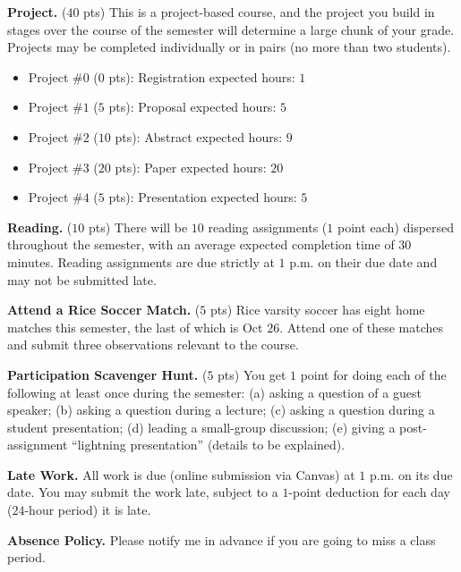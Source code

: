 \documentclass[11pt]{article}
\begin{document}
\begin{adjustwidth}{1cm}{0cm}
  \textbf{Project.} ($40$ pts) This is a project-based course, and the project you build in stages over the course of the semester will determine a large chunk of your grade. Projects may be completed individually or in pairs (no more than two students).
  \begin{itemize}
    \item Project \#$0$ ($0$ pts): Registration                   \hfill expected hours: $1$
    \item Project \#$1$ ($5$ pts): Proposal                       \hfill expected hours: $5$
    \item Project \#$2$ ($10$ pts): Abstract                      \hfill expected hours: $9$
    \item Project \#$3$ ($20$ pts): Paper                         \hfill expected hours: $20$
    \item Project \#$4$ ($5$ pts): Presentation                   \hfill expected hours: $5$
  \end{itemize}

	\textbf{Reading.} ($10$ pts) There will be $10$ reading assignments ($1$ point each) dispersed throughout the semester, with an average expected completion time of $30$ minutes. Reading assignments are due strictly at $1$ p.m. on their due date and may not be submitted late.

  \textbf{Attend a Rice Soccer Match.} ($5$ pts) Rice varsity soccer has eight home matches this semester, the last of which is Oct $26$. Attend one of these matches and submit three observations relevant to the course.

  \textbf{Participation Scavenger Hunt.} ($5$ pts) You get $1$ point for doing each of the following at least once during the semester: (a) asking a question of a guest speaker; (b) asking a question during a lecture; (c) asking a question during a student presentation; (d) leading a small-group discussion; (e) giving a post-assignment ``lightning presentation'' (details to be explained).

  \textbf{Late Work.} All work is due (online submission via Canvas) at $1$ p.m. on its due date. You may submit the work late, subject to a $1$-point deduction for each day ($24$-hour period) it is late.

  \textbf{Absence Policy.} Please notify me in advance if you are going to miss a class period.
\end{adjustwidth}
\end{document}
